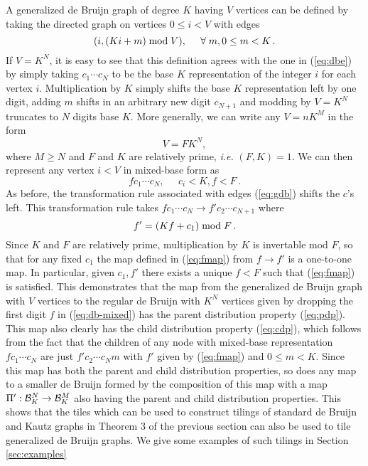 \documentclass[12pt]{article}
\begin{document}
A generalized de Bruijn graph of degree $K$ having $V$ vertices can be
defined by taking the directed graph on vertices $0 \leq i < V$ with
edges
\begin{equation}
(i, (Ki + m) \; {\rm mod} \; V), \;\;\;\;\; \forall \; m, 0 \leq m < K \,.
\label{eq:gdb}
\end{equation}
If $V = K^N$, it is easy to see that this definition agrees with the
one in (\ref{eq:dbe}) by simply taking $c_1 \cdots c_N$ to be the base
$K$ representation of the integer $i$ for each vertex $i$.
Multiplication by $K$ simply shifts the base $K$ representation left
by one digit, adding $m$ shifts in an arbitrary new digit $c_{N +1}$
and modding by $V =K^N$ truncates to $N$ digits base $K$.
More generally, we can write any $V = nK^M$  in the form
\begin{equation}
V = F K^N,
\end{equation}
where $M \geq N$ and $F$ and $K$ are relatively prime, {\it i.e.} $(F, K) = 1$.  We
can then represent any vertex $i < V$ in mixed-base form as
\begin{equation}
f c_1 \cdots c_N, \;\;\;\;\; c_i < K, f < F\,.
\label{eq:db-mixed}
\end{equation}
As before, the transformation rule associated with edges (\ref{eq:gdb})
shifts the $c$'s left.  This transformation rule
takes $fc_1 \cdots c_N \rightarrow f' c_2 \cdots c_{N + 1}$ where
\begin{equation}
f' = (Kf + c_1) \; {\rm mod} \; F \,.
\label{eq:fmap}
\end{equation}
Since $K$ and $F$ are relatively prime, multiplication by $K$ is
invertable mod $F$, so that
for any fixed $c_1$  the map defined in (\ref{eq:fmap}) from $f
\rightarrow f'$ is a one-to-one map.  In particular, given $c_1, f'$
there exists a unique $f < F$ such that (\ref{eq:fmap}) is satisfied.
This demonstrates that the map from the generalized de Bruijn graph
with $V$ vertices to the regular de Bruijn with $K^N$ vertices given
by dropping the first digit $f$ in (\ref{eq:db-mixed}) has the parent
distribution property (\ref{eq:pdp}).  This map also clearly has the
child distribution property (\ref{eq:cdp}), which follows from the
fact that the children of any node with mixed-base representation
$fc_1 \cdots c_N$ are just $f' c_2 \cdots c_N m$ with $f'$ given by
(\ref{eq:fmap}) and $0 \leq m < K$.  Since this map has both the
parent and child distribution properties, so does any  map to
a smaller de Bruijn formed by the  composition of this map with a map
$\Pi':{\cal B}_K^N \rightarrow{\cal B}_K^M$ also having the parent
and child distribution properties.  This shows that the tiles which
can be used to construct tilings of standard de Bruijn and Kautz
graphs in Theorem 3 of the previous section can also be used to tile
generalized de Bruijn graphs.  We give
some examples of such tilings in Section \ref{sec:examples}
\end{document}
